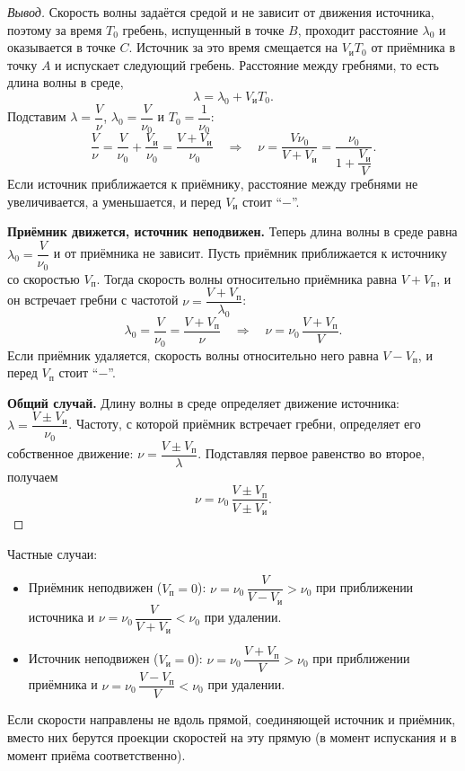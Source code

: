\documentclass[12pt]{article}
\begin{document}
\begin{proof}[Вывод]
		Скорость волны задаётся средой и не зависит от движения источника, поэтому за время $T_0$ гребень, испущенный в точке $B$, проходит расстояние $\lambda_0$ и оказывается в точке $C$. Источник за это время смещается на $V_{\text{и}}T_0$ от приёмника в точку $A$ и испускает следующий гребень. Расстояние между гребнями, то есть длина волны в среде,
		\[
			\lambda = \lambda_0 + V_{\text{и}}T_0.
		\]
		Подставим $\lambda = \dfrac{V}{\nu}$, $\lambda_0 = \dfrac{V}{\nu_0}$ и $T_0 = \dfrac{1}{\nu_0}$:
		\[
			\dfrac{V}{\nu} = \dfrac{V}{\nu_0} + \dfrac{V_{\text{и}}}{\nu_0} = \dfrac{V + V_{\text{и}}}{\nu_0} \quad \Longrightarrow \quad \nu = \dfrac{V\nu_0}{V + V_{\text{и}}} = \dfrac{\nu_0}{1 + \dfrac{V_{\text{и}}}{V}}.
		\]
		Если источник приближается к приёмнику, расстояние между гребнями не увеличивается, а уменьшается, и перед $V_{\text{и}}$ стоит ``$-$''.

		\textbf{Приёмник движется, источник неподвижен.} Теперь длина волны в среде равна $\lambda_0 = \dfrac{V}{\nu_0}$ и от приёмника не зависит. Пусть приёмник приближается к источнику со скоростью $V_{\text{п}}$. Тогда скорость волны относительно приёмника равна $V + V_{\text{п}}$, и он встречает гребни с частотой $\nu = \dfrac{V + V_{\text{п}}}{\lambda_0}$:
		\[
			\lambda_0 = \dfrac{V}{\nu_0} = \dfrac{V + V_{\text{п}}}{\nu} \quad \Longrightarrow \quad \nu = \nu_0\,\dfrac{V + V_{\text{п}}}{V}.
		\]
		Если приёмник удаляется, скорость волны относительно него равна $V - V_{\text{п}}$, и перед $V_{\text{п}}$ стоит ``$-$''.

		\textbf{Общий случай.} Длину волны в среде определяет движение источника: $\lambda = \dfrac{V \pm V_{\text{и}}}{\nu_0}$. Частоту, с которой приёмник встречает гребни, определяет его собственное движение: $\nu = \dfrac{V \pm V_{\text{п}}}{\lambda}$. Подставляя первое равенство во второе, получаем
		\[
			\nu = \nu_0\,\dfrac{V \pm V_{\text{п}}}{V \pm V_{\text{и}}}.
		\]
	\end{proof}

	\begin{note}
		Частные случаи:
		\begin{itemize}
			\item Приёмник неподвижен ($V_{\text{п}} = 0$): $\nu = \nu_0\,\dfrac{V}{V - V_{\text{и}}} > \nu_0$ при приближении источника и $\nu = \nu_0\,\dfrac{V}{V + V_{\text{и}}} < \nu_0$ при удалении.
			\item Источник неподвижен ($V_{\text{и}} = 0$): $\nu = \nu_0\,\dfrac{V + V_{\text{п}}}{V} > \nu_0$ при приближении приёмника и $\nu = \nu_0\,\dfrac{V - V_{\text{п}}}{V} < \nu_0$ при удалении.
		\end{itemize}
		Если скорости направлены не вдоль прямой, соединяющей источник и приёмник, вместо них берутся проекции скоростей на эту прямую (в момент испускания и в момент приёма соответственно).
	\end{note}
\end{document}
